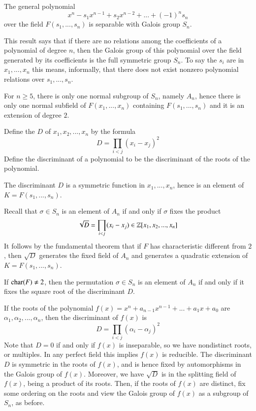 \begin{thm}
    The general polynomial \begin{equation*}
        x^n-s_1x^{n-1}+s_2x^{n-2}+...+(-1)^ns_n
    \end{equation*}
    over the field $F(s_1,...,s_n)$ is separable with Galois group $S_n$.
\end{thm}

This result says that if there are no relations among the coefficients of a polynomial of degree $n$, then the Galois group of this polynomial over the field generated by its coefficients is the full symmetric group $S_n$. To say the $s_i$ are  in $x_1,...,x_n$ this means, informally, that there does not exist nonzero polynomial relations over $s_1,...,s_n$.


For $n \geq 5$, there is only one normal subgroup of $S_n$, namely $A_n$, hence there is only one normal subfield of $F(x_1,...,x_n)$ containing $F(s_1,...,s_n)$ and it is an extension of degree $2$. 

\begin{defn}
    Define the  $D$ of $x_1,x_2,...,x_n$ by the formula \begin{equation*}
        D = \prod_{i < j}(x_i-x_j)^2
    \end{equation*}
    Define the discriminant of a polynomial to be the discriminant of the roots of the polynomial.
\end{defn}

The discriminant $D$ is a symmetric function in $x_1,...,x_n$, hence is an element of $K = F(s_1,...,s_n)$.

Recall that $\sigma \in S_n$ is an element of $A_n$ if and only if $\sigma$ fixes the product \begin{equation*}
    \sqrt{D} = \prod_{i<j}(x_i - x_j) \in \mathbb Z[x_1,x_2,...,x_n]
\end{equation*}
It follows by the fundamental theorem that if $F$ has characteristic different from $2$, then $\sqrt{D}$ generates the fixed field of $A_n$ and generates a quadratic extension of $K = F(s_1,...,s_n)$. 

\begin{prop}
    If $\operatorname{char}(F) \neq 2$, then the permutation $\sigma \in S_n$ is an element of $A_n$ if and only if it fixes the square root of the discriminant $D$.
\end{prop}

If the roots of the polynomial $f(x) = x^n + a_{n-1}x^{n-1} + ...+a_1x+ a_0$ are $\alpha_1,\alpha_2,...,\alpha_n$, then the discriminant of $f(x)$ is \begin{equation*}
    D = \prod_{i < j}(\alpha_i - \alpha_j)^2
\end{equation*}
Note that $D = 0$ if and only if $f(x)$ is inseparable, so we have nondistinct roots, or multiples. In any perfect field this implies $f(x)$ is reducible. The discriminant $D$ is symmetric in the roots of $f(x)$, and is hence fixed by automorphisms in the Galois group of $f(x)$. Moreover, we have $\sqrt{D}$ is in the splitting field of $f(x)$, being a product of its roots. Then, if the roots of $f(x)$ are distinct, fix some ordering on the roots and view the Galois group of $f(x)$ as a subgroup of $S_n$, as before.


